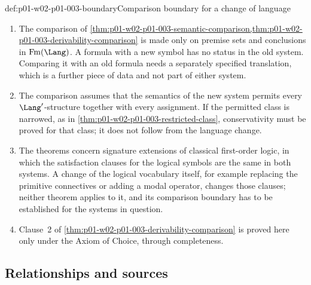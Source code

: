 \begin{hbwarning}{def:p01-w02-p01-003-boundary}{Comparison boundary for a change of language}
\begin{enumerate}
  \item The comparison of
        \cref{thm:p01-w02-p01-003-semantic-comparison,thm:p01-w02-p01-003-derivability-comparison}
        is made only on premise sets and conclusions in
        \(\operatorname{Fm}(\Lang)\). A formula with a new symbol has no
        status in the old system. Comparing it with an old formula needs a
        separately specified translation, which is a further piece of data
        and not part of either system.
  \item The comparison assumes that the semantics of the new system permits
        every \(\Lang'\)-structure together with every assignment. If the
        permitted class is narrowed, as in
        \cref{thm:p01-w02-p01-003-restricted-class}, conservativity must be
        proved for that class; it does not follow from the language change.
  \item The theorems concern signature extensions of classical first-order
        logic, in which the satisfaction clauses for the logical symbols are
        the same in both systems. A change of the logical vocabulary itself,
        for example replacing the primitive connectives or adding a modal
        operator, changes those clauses; neither theorem applies to it, and
        its comparison boundary has to be established for the systems in
        question.
  \item Clause~2 of \cref{thm:p01-w02-p01-003-derivability-comparison} is
        proved here only under the Axiom of Choice, through completeness.
\end{enumerate}
\end{hbwarning}

\subsection{Relationships and sources}
\label{sec:p01-w02-p01-003-relationships}

